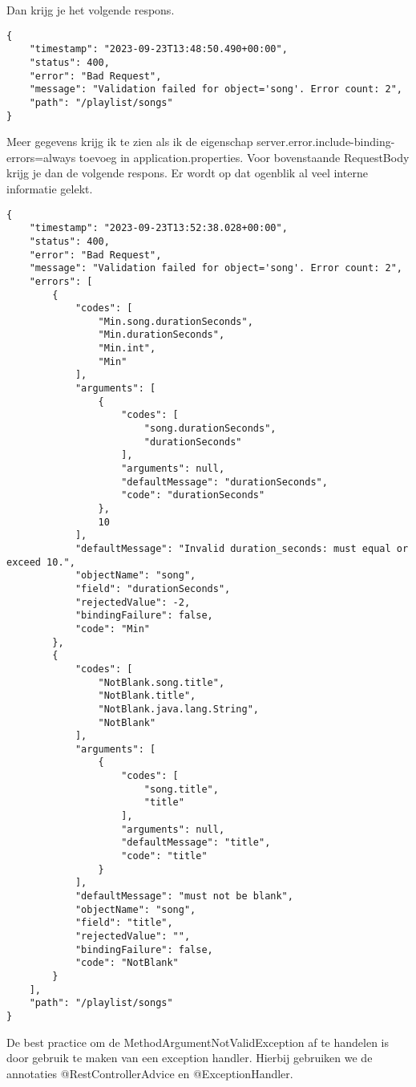 Dan krijg je het volgende respons.

\begin{verbatim}
{
	"timestamp": "2023-09-23T13:48:50.490+00:00",
	"status": 400,
	"error": "Bad Request",
	"message": "Validation failed for object='song'. Error count: 2",
	"path": "/playlist/songs"
}
\end{verbatim}

Meer gegevens krijg ik te zien als ik de eigenschap server.error.include-binding-errors=always toevoeg in application.properties. Voor bovenstaande RequestBody krijg je dan de volgende respons. Er wordt op dat ogenblik al veel interne informatie gelekt.

\begin{verbatim}
{
	"timestamp": "2023-09-23T13:52:38.028+00:00",
	"status": 400,
	"error": "Bad Request",
	"message": "Validation failed for object='song'. Error count: 2",
	"errors": [
		{
			"codes": [
				"Min.song.durationSeconds",
				"Min.durationSeconds",
				"Min.int",
				"Min"
			],
			"arguments": [
				{
					"codes": [
						"song.durationSeconds",
						"durationSeconds"
					],
					"arguments": null,
					"defaultMessage": "durationSeconds",
					"code": "durationSeconds"
				},
				10
			],
			"defaultMessage": "Invalid duration_seconds: must equal or exceed 10.",
			"objectName": "song",
			"field": "durationSeconds",
			"rejectedValue": -2,
			"bindingFailure": false,
			"code": "Min"
		},
		{
			"codes": [
				"NotBlank.song.title",
				"NotBlank.title",
				"NotBlank.java.lang.String",
				"NotBlank"
			],
			"arguments": [
				{
					"codes": [
						"song.title",
						"title"
					],
					"arguments": null,
					"defaultMessage": "title",
					"code": "title"
				}
			],
			"defaultMessage": "must not be blank",
			"objectName": "song",
			"field": "title",
			"rejectedValue": "",
			"bindingFailure": false,
			"code": "NotBlank"
		}
	],
	"path": "/playlist/songs"
}
\end{verbatim}

De best practice om de MethodArgumentNotValidException af te handelen is door gebruik te maken van een exception handler.  Hierbij gebruiken we de annotaties @RestControllerAdvice en @ExceptionHandler. 

